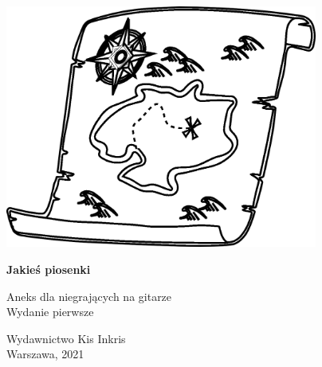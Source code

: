 \documentclass[11pt, twoside]{book}
\begin{document}
\begin{titlepage}
    \begin{center}
        \vspace*{5cm}
        
        \includegraphics[height=8cm]{images/front-obrazek-aneks.png}

        \vspace{1.5cm}

        \Huge\textbf{Jakieś piosenki}
        
        \vspace{0.5cm}
        \Large Aneks dla niegrających na gitarze \\
        \LARGE Wydanie pierwsze
        
        \vfill

        \Large
        Wydawnictwo Kis Inkris \\
        Warszawa, 2021



    \end{center}
\end{titlepage}
\end{document}
